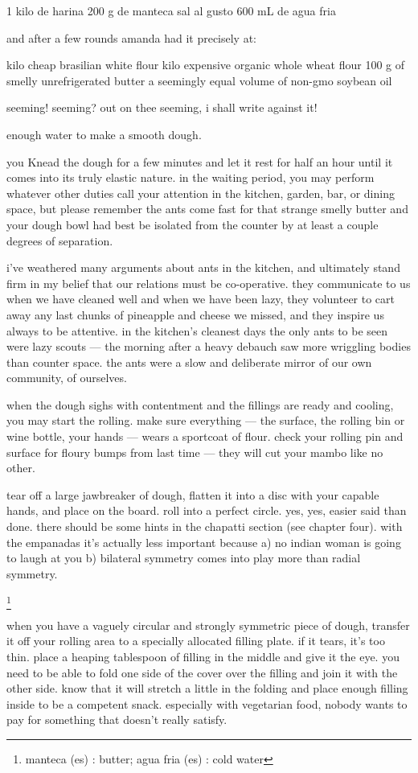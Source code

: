 1 kilo de harina
200 g de manteca
sal al gusto
600 mL de agua fria

and after a few rounds amanda had it precisely at:

\onehalf kilo cheap brasilian white flour
\onehalf kilo expensive organic whole wheat flour
100 g of smelly unrefrigerated butter
a seemingly equal volume of non-gmo soybean oil

seeming! seeming? out on thee seeming, i shall write against it!

enough water to make a smooth dough.

you Knead the dough for a few minutes and let it rest for half an hour until it comes into its truly elastic nature. in the waiting period, you may perform whatever other duties call your attention in the kitchen, garden, bar, or dining space, but please remember the ants come fast for that strange smelly butter and your dough bowl had best be isolated from the counter by at least a couple degrees of separation.

i've weathered many arguments about ants in the kitchen, and ultimately stand firm in my belief that our relations must be co-operative. they communicate to us when we have cleaned well and when we have been lazy, they volunteer to cart away any last chunks of pineapple and cheese we missed, and they inspire us always to be attentive. in the kitchen's cleanest days the only ants to be seen were lazy scouts --- the morning after a heavy debauch saw more wriggling bodies than counter space. the ants were a slow and deliberate mirror of our own community, of ourselves.

when the dough sighs with contentment and the fillings are ready and cooling, you may start the rolling. make sure everything --- the surface, the rolling bin or wine bottle, your hands --- wears a sportcoat of flour. check your rolling pin and surface for floury bumps from last time --- they will cut your mambo like no other. 

tear off a large jawbreaker of dough, flatten it into a disc with your capable hands, and place on the board. roll into a perfect circle. yes, yes, easier said than done. there should be some hints in the chapatti section (see chapter four). with the empanadas it's actually less important because a) no indian woman is going to laugh at you b) bilateral symmetry comes into play more than radial symmetry.

\footnote{manteca (es) : butter;    agua fria (es) : cold water}

when you have a vaguely circular and strongly symmetric piece of dough, transfer it off your rolling area to a specially allocated filling plate. if it tears, it's too thin. place a heaping tablespoon of filling in the middle and give it the eye. you need to be able to fold one side of the cover over the filling and join it with the other side. know that it will stretch a little in the folding and place enough filling inside to be a competent snack. especially with vegetarian food, nobody wants to pay for something that doesn't really satisfy.

